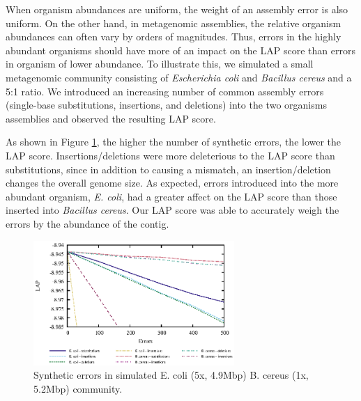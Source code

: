 \documentclass[conference]{IEEEtran}
\begin{document}
When organism abundances are uniform, the weight of an assembly error is also uniform.
On the other hand, in metagenomic assemblies, the relative organism abundances can often vary by orders of magnitudes.
Thus, errors in the highly abundant organisms should have more of an impact on the LAP score than errors in organism of lower abundance.
To illustrate this, we simulated a small metagenomic community consisting of \emph{Escherichia coli} and \emph{Bacillus cereus} and a 5:1 ratio.
We introduced an increasing number of common assembly errors (single-base substitutions, insertions, and deletions) into the two organisms assemblies and observed the resulting LAP score.

As shown in Figure \ref{fig:errors}, the higher the number of synthetic errors, the lower the LAP score.
Insertions/deletions were more deleterious to the LAP score than substitutions, since in addition to causing a mismatch, an insertion/deletion changes the overall genome size.
As expected, errors introduced into the more abundant organism, \emph{E. coli}, had a greater affect on the LAP score than those inserted into \emph{Bacillus cereus}.
Our LAP score was able to accurately weigh the errors by the abundance of the contig.

\begin{figure}[tb!]
\centering
\includegraphics[width=3in]{errors}
\caption{Synthetic errors in simulated E. coli (5x, 4.9Mbp) B. cereus (1x, 5.2Mbp) community.}
\label{fig:errors}
\end{figure}

\end{document}
